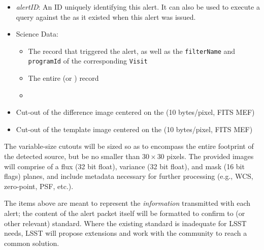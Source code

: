 \documentclass[SE,lsstdraft,toc]{lsstdoc}
\begin{document}
\begin{itemize}
    \item \emph{alertID}: An ID uniquely identifying this alert. It can also be used to execute a query against the \PPDB as it existed when this alert was issued.
    \item Science Data:
    \begin{itemize}
        \item The \DIASource record that triggered the alert, as well as the \texttt{filterName} and \texttt{programId} of the corresponding \texttt{Visit}
	\item The entire \DIAObject (or \SSObject) record
	\item {}  
    \end{itemize}
    \item Cut-out of the difference image centered on the \DIASource (10 bytes/pixel, FITS MEF)
    \item Cut-out of the template image centered on the \DIASource (10 bytes/pixel, FITS MEF)
\end{itemize}

The variable-size cutouts will be sized so as to encompass the entire footprint of the detected source, but be no smaller than $30 \times 30$ pixels. The provided images will comprise of a flux (32 bit float), variance (32 bit float), and mask (16 bit flags) planes, and include metadata necessary for further processing (e.g., WCS, zero-point, PSF, etc.).

The items above are meant to represent the \emph{information} transmitted with each alert; the content of the alert packet itself will be formatted to confirm to \VOEvent (or other relevant) standard. Where the existing standard is inadequate for LSST needs, LSST will propose extensions and work with the community to reach a common solution.
\end{document}
